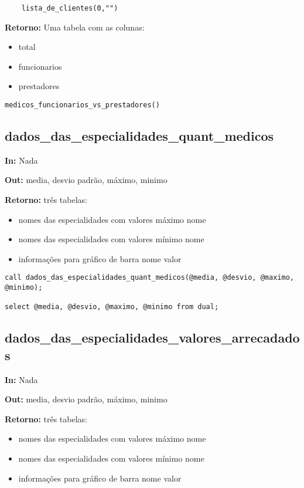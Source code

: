 \begin{verbatim}
	lista_de_clientes(0,"")
\end{verbatim}

\textbf{Retorno:} Uma tabela com as colunas:

\begin{itemize}
	\item total
	\item funcionarios
	\item prestadores
\end{itemize}

\begin{verbatim}
medicos_funcionarios_vs_prestadores()
\end{verbatim}

\subsection{dados\_das\_especialidades\_quant\_medicos}

\textbf{In:} Nada

\textbf{Out:} media, desvio padrão, máximo, minimo

\textbf{Retorno:} três tabelas:

\begin{itemize}
	\item nomes das especialidades com valores máximo
	\subitem nome
	\item nomes das especialidades com valores mínimo
	\subitem nome
	\item informações para gráfico de barra
	\subitem nome
	\subitem valor
\end{itemize}

\begin{verbatim}
call dados_das_especialidades_quant_medicos(@media, @desvio, @maximo, @minimo);

select @media, @desvio, @maximo, @minimo from dual;
\end{verbatim}


\subsection{dados\_das\_especialidades\_valores\_arrecadados}

\textbf{In:} Nada

\textbf{Out:} media, desvio padrão, máximo, minimo

\textbf{Retorno:} três tabelas:

\begin{itemize}
	\item nomes das especialidades com valores máximo
	\subitem nome
	\item nomes das especialidades com valores mínimo
	\subitem nome
	\item informações para gráfico de barra
	\subitem nome
	\subitem valor
\end{itemize}


